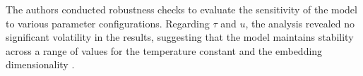 \newpage
The authors conducted robustness checks to evaluate the sensitivity of the model to various parameter configurations. 
Regarding $\tau$ and $u$, the analysis revealed no significant volatility in the results, suggesting that the model maintains stability across a range of values for the temperature constant and the embedding dimensionality \citep[p. 7]{shenkar2022anomaly}. 


